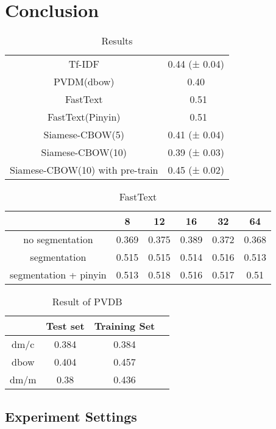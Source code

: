 \chapter{Conclusion}

\begin{table}[]
\centering
\caption{Results}
\label{resultAll}
\begin{tabular}{|c|c|}
\hline
Tf-IDF   & 0.44 (± 0.04) \\
PVDM(dbow) & 0.40    \\
FastText &  ~0.51   \\
FastText(Pinyin) &  ~0.51  \\
Siamese-CBOW(5) & 0.41 (± 0.04) \\
Siamese-CBOW(10) & 0.39 (± 0.03) \\
Siamese-CBOW(10) with pre-train & 0.45 (± 0.02) \\

\hline
\end{tabular}
\end{table}

\begin{table}[]
\centering
\caption{FastText}
\label{fasttext}
\begin{tabular}{|c|c|c|c|c|c|}
\hline
   & 8 & 12 & 16 & 32 & 64 \\
\hline
no segmentation  & 0.369 & 0.375 & 0.389 & 0.372 & 0.368 \\
segmentation  & 0.515 & 0.515 & 0.514 & 0.516 & 0.513 \\
segmentation + pinyin  & 0.513 & 0.518 & 0.516 & 0.517 & 0.51 \\
\hline
\end{tabular}
\end{table}

\begin{table}[]
\centering
\caption{Result of PVDB}
\label{resultAll}
\begin{tabular}{|c|c|c|c|}
\hline
      & Test set & Training Set \\
\hline
dm/c  & 0.384 &  0.384 \\
dbow &  0.404  & 0.457 \\
dm/m &  0.38  & 0.436 \\
\hline
\end{tabular}
\end{table}


\section{Experiment Settings}


